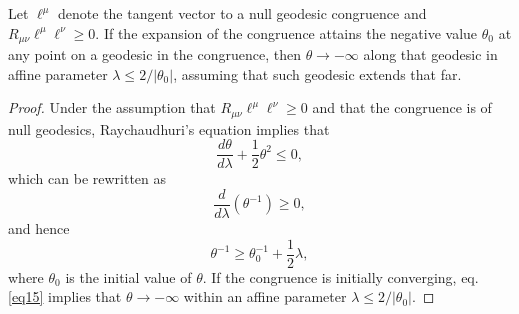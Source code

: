 \documentclass[10pt,a4paper]{amsart}
\begin{document}
\begin{proposition}\label{prop1}
    Let $\ell^{\mu}$ denote the tangent vector to a null geodesic congruence and $R_{\mu\nu}\ell^{\mu}\ell^{\nu}\geq 0$. If the expansion of the congruence attains the negative value $\theta_0$ at any point on a geodesic in the congruence, then $\theta\to -\infty$ along that geodesic in affine parameter $\lambda\leq 2/|\theta_0|$, assuming that such geodesic extends that far.
\end{proposition}

\begin{proof}
Under the assumption that $R_{\mu\nu}\ell^{\mu}\ell^{\nu}\geq 0$ and that the congruence is of null geodesics, Raychaudhuri's equation implies that
\begin{equation}
    \frac{d\theta}{d\lambda}+\frac{1}{2}\theta^2\leq 0,
\end{equation}
which can be rewritten as
\begin{equation}
    \frac{d}{d\lambda}(\theta^{-1})\geq 0,
\end{equation}
and hence
\begin{equation}\label{eq15}
    \theta^{-1}\geq \theta_0^{-1}+\frac{1}{2}\lambda,
\end{equation}
where $\theta_0$ is the initial value of $\theta$. If the congruence is initially converging, eq. \ref{eq15} implies that $\theta\to -\infty$ within an affine parameter $\lambda\leq 2/|\theta_0|$.
\end{proof}
\end{document}
